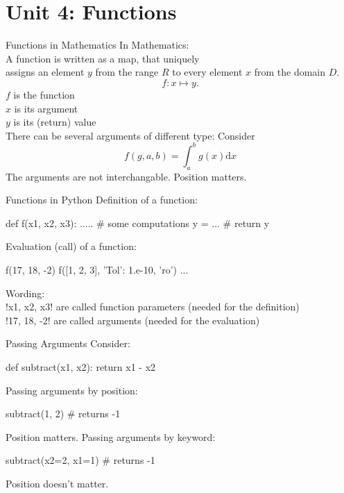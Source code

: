 \documentclass[hyperref={pdfpagelabels=false},table]{beamer}
\begin{document}
\part{Unit 4: Functions}



\begin{frame}[fragile]{Functions in Mathematics}
In Mathematics:\\
A function is written as a map, that uniquely\\
assigns an element $y$ from the range $R$
to every element $x$ from the domain $D$.\\
\vfill
\[
 f: x \mapsto y .
\]
$f$ is the function\\
$x$ is its argument\\
$y$ is its (return) value\\
\vfill
There can be several arguments of different type:
\vfill
Consider
\[
f(g,a,b) = \int_a^b g(x) \mathrm{d} x
\]
The arguments are not interchangable. Position matters.
\end{frame}
\begin{frame}[fragile]{Functions in Python}
Definition of a function:
\begin{python}
def f(x1, x2, x3):
    .....  # some computations
    y = ... #
    return y
\end{python}
Evaluation (call) of a function:
\begin{python}
f(17, 18, -2)
f([1, 2, 3], {'Tol': 1.e-10}, 'ro')
...
\end{python}
Wording:\\
\pyth!x1, x2, x3! are called function parameters {\footnotesize (needed for the definition)}\\
\pyth!17, 18, -2! are called arguments {\footnotesize (needed for the evaluation)}
\end{frame}
\begin{frame}[fragile]{Passing Arguments}
Consider:
\begin{python}
def subtract(x1, x2):
    return x1 - x2
\end{python}
\vfill
Passing arguments by position:
\begin{python}
subtract(1, 2) # returns -1
\end{python}
Position matters.
\vfill
Passing arguments by keyword:
\begin{python}
subtract(x2=2, x1=1) # returns -1
\end{python}
Position doesn't matter.
\end{frame}
\end{document}
